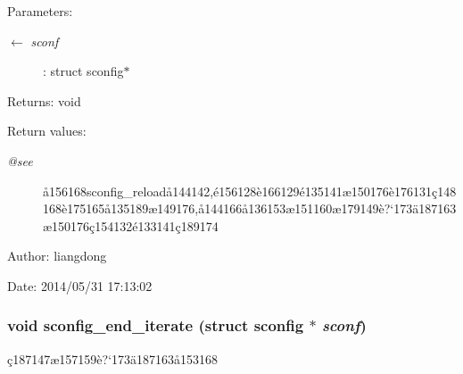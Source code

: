 \begin{Desc}
\item[Parameters:]
\begin{description}
\item[\mbox{$\leftarrow$} {\em sconf}]: struct sconfig$\ast$ \end{description}
\end{Desc}
\begin{Desc}
\item[Returns:]void \end{Desc}
\begin{Desc}
\item[Return values:]
\begin{description}
\item[{\em @see}]\aa{}156168sconfig\_\-reload\aa{}144142,\'{e}156128\`{e}166129\'{e}135141\ae{}150176\`{e}176131\c{c}148168\`{e}175165\aa{}135189\ae{}149176,\aa{}144166\aa{}136153\ae{}151160\ae{}179149\`{e}?`173\"{a}187163\ae{}150176\c{c}154132\'{e}133141\c{c}189174 \end{description}
\end{Desc}
\begin{Desc}
\item[Author:]liangdong \end{Desc}
\begin{Desc}
\item[Date:]2014/05/31 17:13:02 \end{Desc}
\subsubsection{\setlength{\rightskip}{0pt plus 5cm}void sconfig\_\-end\_\-iterate (struct sconfig $\ast$ {\em sconf})}\label{sconfig_8c_a14}


\c{c}187147\ae{}157159\`{e}?`173\"{a}187163\aa{}153168 

